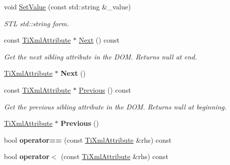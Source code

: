 \begin{DoxyCompactItemize}
void \hyperlink{class_ti_xml_attribute_ab43f67a0cc3ec1d80e62606500f0925f}{Set\+Value} (const std\+::string \&\+\_\+value)
\begin{DoxyCompactList}\small\item\em S\+TL std\+::string form. \end{DoxyCompactList}\item 
\hypertarget{class_ti_xml_attribute_af2e78f1ba9ed56a26ddc80614ed1c393}{}\label{class_ti_xml_attribute_af2e78f1ba9ed56a26ddc80614ed1c393} 
const \hyperlink{class_ti_xml_attribute}{Ti\+Xml\+Attribute} $\ast$ \hyperlink{class_ti_xml_attribute_af2e78f1ba9ed56a26ddc80614ed1c393}{Next} () const
\begin{DoxyCompactList}\small\item\em Get the next sibling attribute in the D\+OM. Returns null at end. \end{DoxyCompactList}\item 
\hypertarget{class_ti_xml_attribute_a138320aa7793b148ba7e5bd0a0ea4db6}{}\label{class_ti_xml_attribute_a138320aa7793b148ba7e5bd0a0ea4db6} 
\hyperlink{class_ti_xml_attribute}{Ti\+Xml\+Attribute} $\ast$ {\bfseries Next} ()
\item 
\hypertarget{class_ti_xml_attribute_afc7bbfdf83d59fbc4ff5e283d27b5d7d}{}\label{class_ti_xml_attribute_afc7bbfdf83d59fbc4ff5e283d27b5d7d} 
const \hyperlink{class_ti_xml_attribute}{Ti\+Xml\+Attribute} $\ast$ \hyperlink{class_ti_xml_attribute_afc7bbfdf83d59fbc4ff5e283d27b5d7d}{Previous} () const
\begin{DoxyCompactList}\small\item\em Get the previous sibling attribute in the D\+OM. Returns null at beginning. \end{DoxyCompactList}\item 
\hypertarget{class_ti_xml_attribute_ae4dabc932cba945ed1e92fec5f121193}{}\label{class_ti_xml_attribute_ae4dabc932cba945ed1e92fec5f121193} 
\hyperlink{class_ti_xml_attribute}{Ti\+Xml\+Attribute} $\ast$ {\bfseries Previous} ()
\item 
\hypertarget{class_ti_xml_attribute_a51eef33c2cdd55831447af46be0baf8b}{}\label{class_ti_xml_attribute_a51eef33c2cdd55831447af46be0baf8b} 
bool {\bfseries operator==} (const \hyperlink{class_ti_xml_attribute}{Ti\+Xml\+Attribute} \&rhs) const
\item 
\hypertarget{class_ti_xml_attribute_a80dcb758cc5ab27ce9865301e2da1335}{}\label{class_ti_xml_attribute_a80dcb758cc5ab27ce9865301e2da1335} 
bool {\bfseries operator$<$} (const \hyperlink{class_ti_xml_attribute}{Ti\+Xml\+Attribute} \&rhs) const

\end{DoxyCompactItemize}
